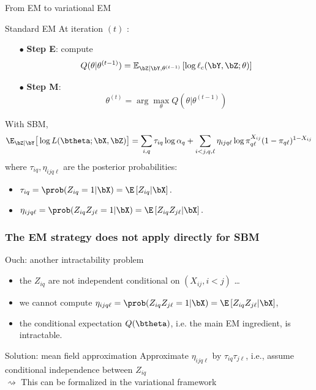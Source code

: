 \documentclass{beamer}\usepackage[]{graphicx}\usepackage[]{color}
\begin{document}
\begin{frame}{From EM to variational EM}

\begin{block}{Standard EM}
At iteration $(t)$ : 
\begin{itemize}
 \item[$\bullet$]\textbf{Step E}: compute 
 $$ Q(\theta | \theta^{(t-1)}) =   \mathbb E_{\bZ | \bY, \theta^{(t-1)} } \left[\log \ell_c(\bY,\bZ; \theta)  \right] $$
 \item[$\bullet$]\textbf{Step M}: 
 $$ \theta^{(t)} = \arg \max_{\theta} Q(\theta | \theta^{(t-1)})$$
 \end{itemize}
\end{block}

  With SBM,
    \begin{equation*}
      \E_{\bZ|\bY} \big[\log L(\btheta;\bX,\bZ) \big] = \sum_{i,q} \tau_{iq} \log \alpha_q + \sum_{i<j,q,\ell} \eta_{ijq\ell} \log \pi_{q\ell}^{X_{ij}} (1-\pi_{q\ell})^{1-X_{ij}}
    \end{equation*}
      where $\tau_ {iq}, \eta_{ijq\ell}$ are the posterior probabilities:
      \begin{itemize}
        \item $\tau_{iq} = \prob(Z_{iq} = 1 | \bX) = \E \left[Z_{iq} | \bX\right].$
        \item $\eta_{ijq\ell} = \prob(Z_{iq}Z_{j\ell} = 1 | \bX) = \E \left[Z_{iq}Z_{j\ell} | \bX\right].$
      \end{itemize}

\end{frame}

\begin{frame}
  \frametitle{The EM strategy does not apply directly for SBM}

  \begin{block}{Ouch: another intractability problem}
    \begin{itemize}
      \item the $Z_{iq}$ are \alert{not independent conditional on $(X_{ij}, i<j)$} \dots
      \item we cannot compute $\eta_{ijq\ell} = \prob(Z_{iq}Z_{j\ell} = 1 | \bX) = \E \left[Z_{iq}Z_{j\ell} | \bX\right]$,
      \item the conditional expectation $Q(\btheta)$, i.e. the main EM ingredient, is \alert{intractable}.
    \end{itemize}
  \end{block}

  \vfill

  \begin{block}{Solution: mean field approximation}
    Approximate $\eta_{ijq\ell}$ by $\tau_{iq}\tau_{j\ell}$, i.e., \alert{assume conditional independence between $Z_{iq}$}\\

    $\rightsquigarrow$ This can be formalized in the variational framework
  \end{block}


\end{frame}
\end{document}
